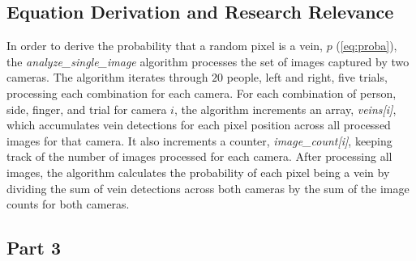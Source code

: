 \subsection{Equation Derivation and Research Relevance}
In order to derive the probability that a random pixel is a vein, $p$ (\ref{eq:proba}), the \textit{analyze\_single\_image} algorithm processes the set of images captured by two cameras. The algorithm iterates through \(20\) people, left and right, five trials, processing each combination for each camera. For each combination of person, side, finger, and trial for camera \(i\), the algorithm increments an array, \textit{veins[i]}, which accumulates vein detections for each pixel position across all processed images for that camera. It also increments a counter, \textit{image\_count[i]}, keeping track of the number of images processed for each camera. 
After processing all images, the algorithm calculates the probability of each pixel being a vein by dividing the sum of vein detections across both cameras by the sum of the image counts for both cameras.


\subsection{Part 3}